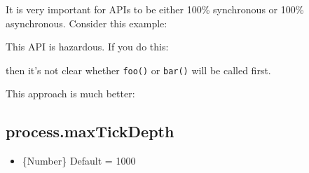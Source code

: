 It is very important for APIs to be either 100\% synchronous or 100\%
asynchronous. Consider this example:

\begin{Shaded}
\begin{Highlighting}[]
 
   
    \NormalTok{;}
  \NormalTok{\}}

  \NormalTok{(}
\NormalTok{\}}
\end{Highlighting}
\end{Shaded}

This API is hazardous. If you do this:

\begin{Shaded}
\begin{Highlighting}[]
\NormalTok{, }\NormalTok{() \{}
\NormalTok{\});}
\end{Highlighting}
\end{Shaded}

then it's not clear whether \texttt{foo()} or \texttt{bar()} will be
called first.

This approach is much better:

\begin{Shaded}
\begin{Highlighting}[]
 
   
    \NormalTok{;}
  \NormalTok{\}}

  \NormalTok{(}
\NormalTok{\}}
\end{Highlighting}
\end{Shaded}

\subsection{process.maxTickDepth}

\begin{itemize}
\item
  \{Number\} Default = 1000
\end{itemize}

